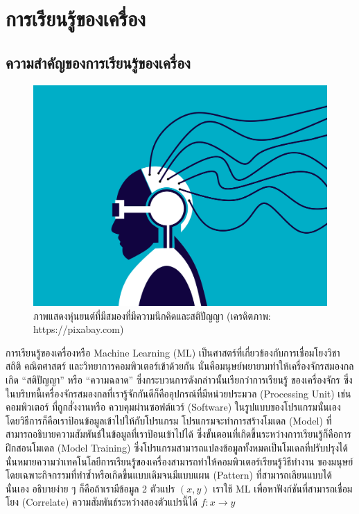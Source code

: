 

\chapter{การเรียนรู้ของเครื่อง}
\label{ch:ml}

\section{ความสำคัญของการเรียนรู้ของเครื่อง}

\begin{figure}[H]
    \centering
    \includegraphics[width=0.8\linewidth]{fig/cyborg.png}
    \caption{ภาพแสดงหุ่นยนต์ที่มีสมองที่มีความนึกคิดและสติปัญญา (เครดิตภาพ: https://pixabay.com)}
    \label{fig:cyborg}
\end{figure}

การเรียนรู้ของเครื่องหรือ Machine Learning (ML) เป็นศาสตร์ที่เกี่ยวข้องกับการเชื่อมโยงวิชาสถิติ คณิตศาสตร์ และวิทยาการคอมพิวเตอร์เข้าด้วยกัน
นั่นคือมนุษย์พยายามทำให้เครื่องจักรสมองกลเกิด \enquote{สติปัญญา} หรือ \enquote{ความฉลาด} ซึ่งกระบวนการดังกล่าวนั้นเรียกว่าการเรียนรู้%
ของเครื่องจักร ซึ่งในบริบทนี้เครื่องจักรสมองกลที่เรารู้จักกันดีก็คืออุปกรณ์ที่มีหน่วยประมวล (Processing Unit) เช่น คอมพิวเตอร์ ที่ถูกสั่งงานหรือ%
ควบคุมผ่านซอฟต์แวร์ (Software) ในรูปแบบของโปรแกรมนั่นเอง โดยวิธีการก็คือเราป้อนข้อมูลเข้าไปให้กับโปรแกรม โปรแกรมจะทำการสร้างโมเดล
(Model) ที่สามารถอธิบายความสัมพันธ์ในข้อมูลที่เราป้อนเข้าไปได้ ซึ่งขั้นตอนที่เกิดขึ้นระหว่างการเรียนรู้ก็คือการฝึกสอนโมเดล (Model Training) 
ซึ่งโปรแกรมสามารถแปลงข้อมูลทั้งหมดเป็นโมเดลที่ปรับปรุงได้ นั่นหมายความว่าเทคโนโลยีการเรียนรู้ของเครื่องสามารถทำให้คอมพิวเตอร์เรียนรู้วิธีทำงาน%
ของมนุษย์โดยเฉพาะกิจกรรมที่ทำซ้ำหรือเกิดขึ้นแบบเดิมจนมีแบบแผน (Pattern) ที่สามารถเลียนแบบได้นั่นเอง อธิบายง่าย ๆ ก็คือถ้าเรามีข้อมูล 2 
ตัวแปร $(x,y)$ เราใช้ ML เพื่อหาฟังก์ชันที่สามารถเชื่อมโยง (Correlate) ความสัมพันธ์ระหว่างสองตัวแปรนี้ได้ $f: x\rightarrow y$

